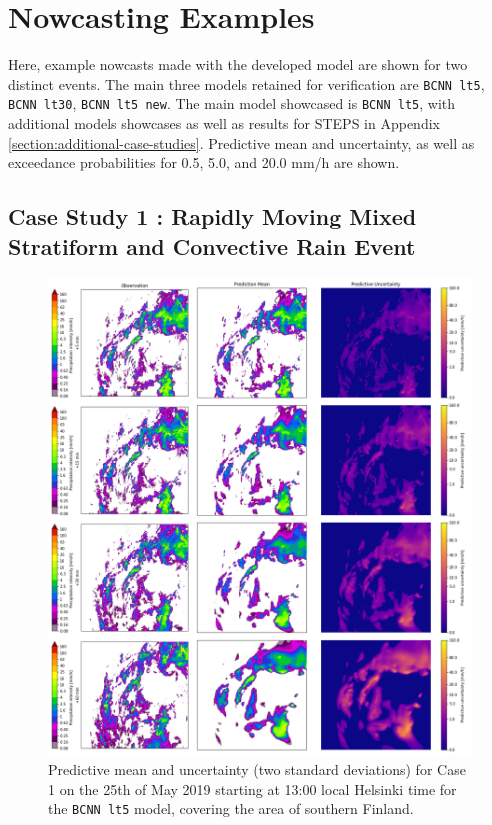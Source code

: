 \section{Nowcasting Examples}

Here, example nowcasts made with the developed model are shown for two distinct events. The main three models retained for verification are \texttt{BCNN lt5}, \texttt{BCNN lt30}, \texttt{BCNN lt5 new}. The main model showcased is \texttt{BCNN lt5}, with additional models showcases as well as results for STEPS in Appendix \ref{section:additional-case-studies}.  Predictive mean and uncertainty, as well as exceedance probabilities for 0.5, 5.0, and 20.0 mm/h are shown.  

\subsection{Case Study 1 : Rapidly Moving Mixed Stratiform and Convective Rain Event}

\begin{figure}[H]
	\centering
	\includegraphics[width=\textwidth]{images/cases/bcnn_mean_case1}
	\caption{Predictive mean and uncertainty (two standard deviations) for Case 1 on the 25th of May 2019 starting at 13:00 local Helsinki time for the \texttt{BCNN lt5} model, covering the area of southern Finland.}
	\label{fig:bcnn_mean_case1}
\end{figure}

